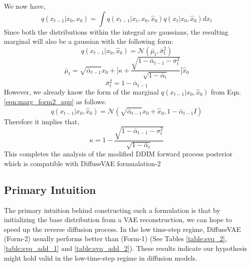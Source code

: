 \documentclass[10pt]{article} \usepackage[accepted]{tmlr}
\begin{document}
We now have,
\begin{equation}
    q(x_{t-1}|x_0, \hat{x}_0) = \int q(x_{t-1}|x_t, x_0, \hat{x}_0)q(x_t|x_0, \hat{x}_0) dx_t
\end{equation}
Since both the distributions within the integral are gaussians, the resulting marginal will also be a gaussian with the following form:
\begin{equation}
    q(x_{t-1}|x_0, \hat{x}_0) = \mathcal{N}(\bar{\mu}_t, \bar{\sigma}_t^2)
\end{equation}
\begin{equation}
    \bar{\mu}_t = \sqrt{\bar{\alpha}_{t-1}}x_0 + \Bigg[ \kappa + \frac{\sqrt{1 - \bar{\alpha}_{t-1} - \sigma_t^2}}{\sqrt{1 - \bar{\alpha}_t}} \Bigg] \hat{x}_0
\end{equation}
\begin{equation}
    \bar{\sigma}_t^2 = 1 - \bar{\alpha}_{t-1}
\end{equation}
However, we already know the form of the marginal $q(x_{t-1}|x_0,\hat{x}_0)$ from Eqn. \ref{eqn:marg_form2_app} as follows:
\begin{equation}
    q(x_{t-1}|x_0,\hat{x}_0) = \mathcal{N}(\sqrt{\bar{\alpha}_{t-1}}x_0 + \hat{x}_0, 1 - \bar{\alpha}_{t-1}I)
\end{equation}
Therefore it implies that,
\begin{equation}
    \kappa = 1 - \frac{\sqrt{1 - \bar{\alpha}_{t-1} - \sigma_t^2}}{\sqrt{1 - \bar{\alpha}_t}}
\end{equation}
This completes the analysis of the modified DDIM forward process posterior which is compatible with DiffuseVAE formualation-2
\noindent
\subsection{Primary Intuition}
The primary intuition behind constructing such a formulation is that by initializing the base distribution from a VAE reconstruction, we can hope to speed up the reverse diffusion process. In the low time-step regime, DiffuseVAE (Form-2) usually performs better than (Form-1) (See Tables \ref{table:svq_2}, \ref{table:svq_add_1}  and \ref{table:svq_add_2}). These results indicate our hypothesis might hold valid in the low-time-step regime in diffusion models.
\end{document}
